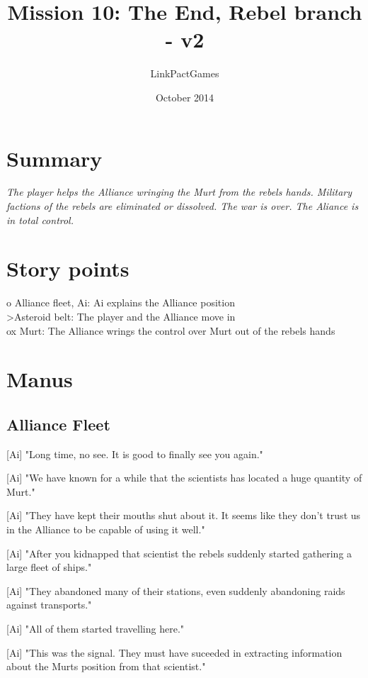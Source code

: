 \documentclass[a4paper,12pt]{article}
\begin{document}
\title{Mission 10: The End, Rebel branch - v2}
\author{LinkPactGames}
\date{October 2014}
\maketitle

\section{Summary}

\textit{The player helps the Alliance wringing the Murt from the rebels hands. Military factions
of the rebels are eliminated or dissolved. The war is over. The Aliance is in total control.}

\section{Story points}

o Alliance fleet, Ai: Ai explains the Alliance position\\
\textgreater Asteroid belt: The player and the Alliance move in\\
ox Murt: The Alliance wrings the control over Murt out of the rebels hands\\

\section{Manus}

\subsection{Alliance Fleet}

[Ai] "Long time, no see. It is good to finally see you again."

[Ai] "We have known for a while that the scientists has located a huge quantity of Murt."

[Ai] "They have kept their mouths shut about it. It seems like they don't trust us in the Alliance to be capable
of using it well."

[Ai] "After you kidnapped that scientist the rebels suddenly started gathering a large fleet of ships." 

[Ai] "They abandoned many of their stations, even suddenly abandoning raids against transports."

[Ai] "All of them started travelling here."

[Ai] "This was the signal. They must have suceeded in extracting information about the Murts position from that scientist."
\end{document}
